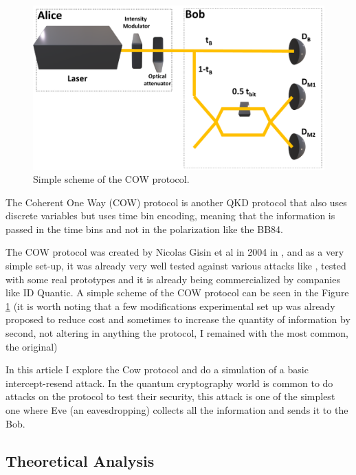 \begin{refsection}
\begin{figure}[h]
\centering
\includegraphics[width=1\linewidth]{./sdf/tq_76558_cow_protocol/slides/figures/Full2.pdf}
\caption{Simple scheme of the COW protocol.}
\label{fig:Scheme}
\end{figure}

The Coherent One Way (COW) protocol is another QKD protocol that also uses discrete variables but uses time bin encoding, meaning that the information is passed in the time bins and not in the polarization like the BB84.

The COW protocol was created by Nicolas Gisin et al in 2004 in \cite{gisin2004towards}, and as a very simple set-up, it was already very well tested against various attacks like \cite{branciard2006zero}, tested with some real prototypes \cite{stucki2009continuous} and it is already being commercialized by companies like ID Quantic. A simple scheme of the COW protocol can be seen in the Figure \ref{fig:Scheme} (it is worth noting that a few modifications experimental set up was already proposed \cite{roberts2017modulator} to reduce cost and sometimes to increase the quantity of information by second, not altering in anything the protocol, I remained with the most common, the original)

In this article I explore the Cow protocol and do a simulation of a basic intercept-resend attack. In the quantum cryptography world is common to do attacks on the protocol to test their security, this attack is one of the simplest one where Eve (an eavesdropping) collects all the information and sends it to the Bob.

\subsection{Theoretical Analysis}


\end{refsection}
